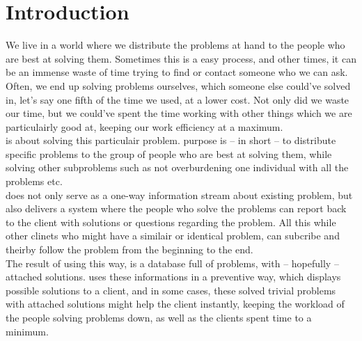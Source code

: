 \section{Introduction}
\label{sec:introduction}


We live in a world where we distribute the problems at hand to the people who are best at solving them. Sometimes this is a easy process, and other times, it can be an immense waste of time trying to find or contact someone who we can ask. Often, we end up solving problems ourselves, which someone else could've solved in, let's say one fifth of the time we used, at a lower cost. Not only did we waste our time, but we could've spent the time working with other things which we are particulairly good at, keeping our work efficiency at a maximum.\\

\hdesk{} is about solving this particulair problem. \hdesk{} purpose is -- in short -- to distribute specific problems to the group of people who are best at solving them, while solving other subproblems such as not overburdening one individual with all the problems etc.\\
\hdesk{} does not only serve as a one-way information stream about existing problem, but also delivers a system where the people who solve the problems can report back to the client with solutions or questions regarding the problem. All this while other clinets who might have a similair or identical problem, can subcribe and theirby follow the problem from the beginning to the end.\\

The result of using \hdesk{} this way, is a database full of problems, with -- hopefully -- attached solutions. \hdesk{} uses these informations in a preventive way, which displays possible solutions to a client, and in some cases, these solved trivial problems with attached solutions might help the client instantly, keeping the workload of the people solving problems down, as well as the clients spent time to a minimum.










